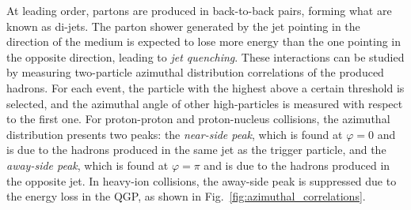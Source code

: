 At leading order, partons are produced in back-to-back pairs, forming what are known as di-jets. The parton shower generated by the jet pointing in the direction of the medium is expected to lose more energy than the one pointing in the opposite direction, leading to \emph{jet quenching}. These interactions can be studied by measuring two-particle azimuthal distribution correlations of the produced hadrons. For each event, the particle with the highest \pt above a certain threshold is selected, and the azimuthal angle of other high-\pt particles is measured with respect to the first one. For proton-proton and proton-nucleus collisions, the azimuthal distribution presents two peaks: the \emph{near-side peak}, which is found at $\varphi=0$ and is due to the hadrons produced in the same jet as the trigger particle, and the \emph{away-side peak}, which is found at $\varphi=\pi$ and is due to the hadrons produced in the opposite jet. In heavy-ion collisions, the away-side peak is suppressed due to the energy loss in the QGP, as shown in Fig.~\ref{fig:azimuthal_correlations}.


